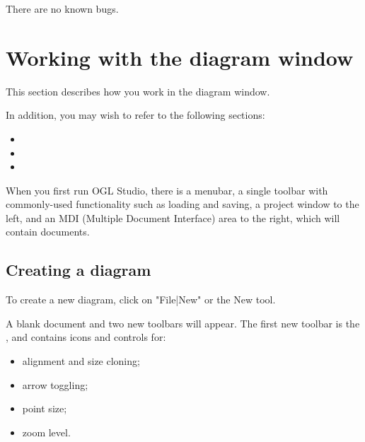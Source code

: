 There are no known bugs.

\begin{comment}
\chapter{Getting Started}\label{gettingstarted}%
\setheader{{\it CHAPTER \thechapter}}{}{}{}{}{{\it CHAPTER \thechapter}}%
\setfooter{\thepage}{}{}{}{}{\thepage}%
\end{comment}

\chapter{Working with the diagram window}\label{schedule}%
%
\setfooter{\thepage}{}{}{}{}{\thepage}%

This section describes how you work in the diagram window.

In addition, you may wish to refer to the following sections:

\begin{itemize}\itemsep=0pt
\item {}
\item {}
\item {}
\end{itemize}

When you first run OGL Studio, there is a menubar, a single
toolbar with commonly-used functionality such as loading and
saving, a project window to the left, and an MDI (Multiple Document
Interface) area to the right, which will contain documents.

\section{Creating a diagram}

To create a new diagram, click on "File|New" or the New tool.

A blank document and two new toolbars will appear. The first
new toolbar is the , and contains
icons and controls for:

\begin{itemize}\itemsep=0pt
\item alignment and size cloning;
\item arrow toggling;
\item point size;
\item zoom level.
\end{itemize}


